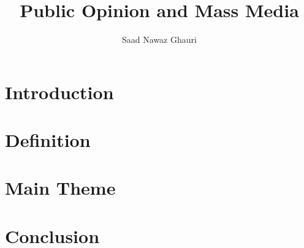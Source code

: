 \documentclass[a4paper,11pt]{article}
\author{Saad Nawaz Ghauri}
\title{Public Opinion and Mass Media}
\begin{document}
\maketitle
\tableofcontents


\section{Introduction}

\section{Definition}

\section{Main Theme}

\section{Conclusion}
\end{document}

